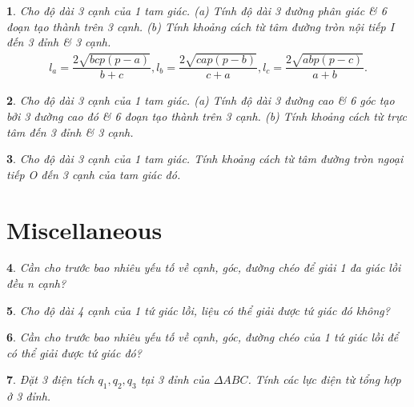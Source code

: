 \documentclass{article}
\newtheorem{baitoan}{}
\begin{document}
\begin{baitoan}
	Cho độ dài 3 cạnh của 1 tam giác. (a) Tính độ dài 3 đường phân giác \& 6 đoạn tạo thành trên 3 cạnh. (b) Tính khoảng cách từ tâm đường tròn nội tiếp I đến 3 đỉnh \& 3 cạnh.
	\begin{align*}
		l_a = \dfrac{2\sqrt{bcp(p - a)}}{b + c},l_b = \dfrac{2\sqrt{cap(p - b)}}{c + a},l_c = \dfrac{2\sqrt{abp(p - c)}}{a + b}.
	\end{align*}
\end{baitoan}

\begin{baitoan}
	Cho độ dài 3 cạnh của 1 tam giác. (a) Tính độ dài 3 đường cao \& 6 góc tạo bởi 3 đường cao đó \& 6 đoạn tạo thành trên 3 cạnh. (b) Tính khoảng cách từ trực tâm đến 3 đỉnh \& 3 cạnh.
\end{baitoan}

\begin{baitoan}
	Cho độ dài 3 cạnh của 1 tam giác. Tính khoảng cách từ tâm đường tròn ngoại tiếp O đến 3 cạnh của tam giác đó.
\end{baitoan}


\section{Miscellaneous}

\begin{baitoan}
	Cần cho trước bao nhiêu yếu tố về cạnh, góc, đường chéo để giải 1 đa giác lồi đều n cạnh?
\end{baitoan}

\begin{baitoan}
	Cho độ dài 4 cạnh của 1 tứ giác lồi, liệu có thể giải được tứ giác đó không?
\end{baitoan}

\begin{baitoan}
	Cần cho trước bao nhiêu yếu tố về cạnh, góc, đường chéo của 1 tứ giác lồi để có thể giải được tứ giác đó?
\end{baitoan}

\begin{baitoan}
	Đặt 3 điện tích $q_1,q_2,q_3$ tại 3 đỉnh của $\Delta ABC$. Tính các lực điện từ tổng hợp ở 3 đỉnh.
\end{baitoan}


\printbibliography[heading=bibintoc]
	
\end{document}

